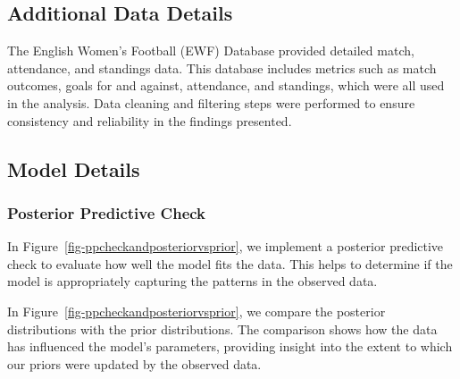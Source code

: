 \documentclass[
  letterpaper,
  DIV=11,
  numbers=noendperiod]{scrartcl}
\begin{document}
\hypertarget{additional-data-details}{%
\subsection{Additional Data Details}\label{additional-data-details}}

The English Women's Football (EWF) Database provided detailed match,
attendance, and standings data. This database includes metrics such as
match outcomes, goals for and against, attendance, and standings, which
were all used in the analysis. Data cleaning and filtering steps were
performed to ensure consistency and reliability in the findings
presented.

\hypertarget{sec-model-details}{%
\subsection{Model Details}\label{sec-model-details}}

\hypertarget{posterior-predictive-check}{%
\subsubsection{Posterior Predictive
Check}\label{posterior-predictive-check}}

In Figure~\ref{fig-ppcheckandposteriorvsprior}, we implement a posterior
predictive check to evaluate how well the model fits the data. This
helps to determine if the model is appropriately capturing the patterns
in the observed data.

In Figure~\ref{fig-ppcheckandposteriorvsprior}, we compare the posterior
distributions with the prior distributions. The comparison shows how the
data has influenced the model's parameters, providing insight into the
extent to which our priors were updated by the observed data.
\end{document}
